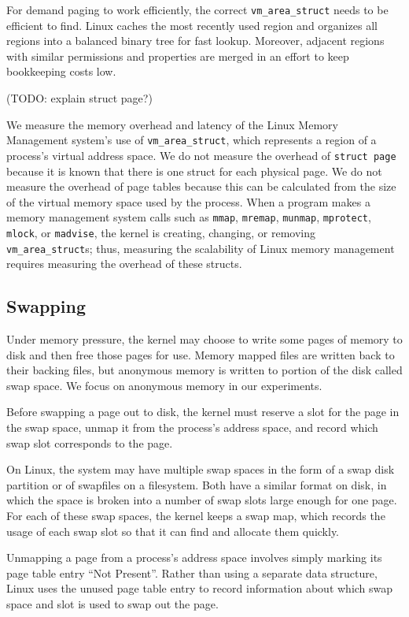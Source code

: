 \documentclass[twocolumn,11pt]{article}
\begin{document}
For demand paging to work efficiently, the correct \texttt{vm\_area\_struct}
needs to be efficient to find. Linux caches the most recently used region and
organizes all regions into a balanced binary tree for fast lookup.  Moreover,
adjacent regions with similar permissions and properties are merged in an
effort to keep bookkeeping costs low.

(TODO: explain struct page?)

We measure the memory overhead and latency of the Linux Memory Management
system's use of \texttt{vm\_area\_struct}, which represents a region of a
process's virtual address space.  
We do not measure the overhead of \texttt{struct page} because it is known that
there is one struct for each physical page. We do not measure the overhead of
page tables because this can be calculated from the size of the virtual memory
space used by the process.  When a program makes a memory management system
calls such as \texttt{mmap}, \texttt{mremap}, \texttt{munmap},
\texttt{mprotect}, \texttt{mlock}, or \texttt{madvise}, the kernel is creating,
changing, or removing \texttt{vm\_area\_struct}s; thus, measuring the
scalability of Linux memory management requires measuring the overhead of these
structs.

\subsection{Swapping}

Under memory pressure, the kernel may choose to write some pages of memory to
disk and then free those pages for use. Memory mapped files are written back to
their backing files, but anonymous memory is written to portion of the disk
called swap space. We focus on anonymous memory in our experiments.

Before swapping a page out to disk, the kernel must reserve a slot for the page
in the swap space, unmap it from the process's address space, and record which
swap slot corresponds to the page.

On Linux, the system may have multiple swap spaces in the form of a swap disk
partition or of swapfiles on a filesystem. Both have a similar format on disk,
in which the space is broken into a number of swap slots large enough for one
page. For each of these swap spaces, the kernel keeps a swap map, which records
the usage of each swap slot so that it can find and allocate them quickly.

Unmapping a page from a process's address space involves simply marking its page
table entry ``Not Present''. Rather than using a separate data structure, Linux
uses the unused page table entry to record information about which swap space
and slot is used to swap out the page.
\end{document}
